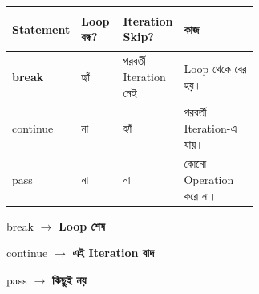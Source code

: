 

\begin{tabularx}
{\linewidth}
{
|>{\bfseries\RaggedRight\arraybackslash}p{0.21\linewidth}
|>{\centering\arraybackslash}p{0.17\linewidth}
|>{\centering\arraybackslash}p{0.23\linewidth}
|Y|
}

\hline
{}

\textbf{Statement}
&
\textbf{Loop বন্ধ?}
&
\textbf{Iteration Skip?}
&
\textbf{কাজ}
\\
\hline

\textenglish{\ttfamily break}
&
হ্যাঁ
&
পরবর্তী Iteration নেই
&
Loop থেকে বের হয়।
\\
\hline

\textenglish{\ttfamily continue}
&
না
&
হ্যাঁ
&
পরবর্তী Iteration-এ যায়।
\\
\hline

\textenglish{\ttfamily pass}
&
না
&
না
&
কোনো Operation করে না।
\\
\hline

\end{tabularx}

\begin{rememberbox}

\begin{center}

\textenglish{\ttfamily break}
\(\longrightarrow\)
\textbf{Loop শেষ}

\qquad

\textenglish{\ttfamily continue}
\(\longrightarrow\)
\textbf{এই Iteration বাদ}

\qquad

\textenglish{\ttfamily pass}
\(\longrightarrow\)
\textbf{কিছুই নয়}

\end{center}

\end{rememberbox}



